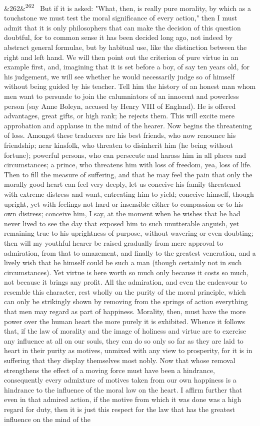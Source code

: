 \documentclass[12pt]{article}
\newcommand{\para}[1][]{\par\noindent\ifx&#1&\else\textsuperscript{\footnotesize #1}~\fi}
\begin{document}
\para[262] But if it is asked: "What, then, is really pure morality, by which as a touchstone we must test the moral significance of every action," then I must admit that it is only philosophers that can make the decision of this question doubtful, for to common sense it has been decided long ago, not indeed by abstract general formulae, but by habitual use, like the distinction between the right and left hand. We will then point out the criterion of pure virtue in an example first, and, imagining that it is set before a boy, of say ten years old, for his judgement, we will see whether he would necessarily judge so of himself without being guided by his teacher. Tell him the history of an honest man whom men want to persuade to join the calumniators of an innocent and powerless person (say Anne Boleyn, accused by Henry VIII of England). He is offered advantages, great gifts, or high rank; he rejects them. This will excite mere approbation and applause in the mind of the hearer. Now begins the threatening of loss. Amongst these traducers are his best friends, who now renounce his friendship; near kinsfolk, who threaten to disinherit him (he being without fortune); powerful persons, who can persecute and harass him in all places and circumstances; a prince, who threatens him with loss of freedom, yea, loss of life. Then to fill the measure of suffering, and that he may feel the pain that only the morally good heart can feel very deeply, let us conceive his family threatened with extreme distress and want, entreating him to yield; conceive himself, though upright, yet with feelings not hard or insensible either to compassion or to his own distress; conceive him, I say, at the moment when he wishes that he had never lived to see the day that exposed him to such unutterable anguish, yet remaining true to his uprightness of purpose, without wavering or even doubting; then will my youthful hearer be raised gradually from mere approval to admiration, from that to amazement, and finally to the greatest veneration, and a lively wish that he himself could be such a man (though certainly not in such circumstances). Yet virtue is here worth so much only because it costs so much, not because it brings any profit. All the admiration, and even the endeavour to resemble this character, rest wholly on the purity of the moral principle, which can only be strikingly shown by removing from the springs of action everything that men may regard as part of happiness. Morality, then, must have the more power over the human heart the more purely it is exhibited. Whence it follows that, if the law of morality and the image of holiness and virtue are to exercise any influence at all on our souls, they can do so only so far as they are laid to heart in their purity as motives, unmixed with any view to prosperity, for it is in suffering that they display themselves most nobly. Now that whose removal strengthens the effect of a moving force must have been a hindrance, consequently every admixture of motives taken from our own happiness is a hindrance to the influence of the moral law on the heart. I affirm further that even in that admired action, if the motive from which it was done was a high regard for duty, then it is just this respect for the law that has the greatest influence on the mind of the 
\end{document}
